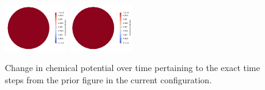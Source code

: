 \documentclass[12pt,3p]{article}
\numberwithin{equation}{section}
\begin{document}
\begin{figure}[!htb]
\includegraphics[width=0.24\textwidth]{../Results/Sphere/S_140_chi_3.0e-01_G_1e+00_l0_2.0e+00/Images/ChemicalPotential/ChemPot_109}
\includegraphics[width=0.24\textwidth]{../Results/Sphere/S_140_chi_3.0e-01_G_1e+00_l0_2.0e+00/Images/ChemicalPotential/ChemPot_139}
\caption{Change in chemical potential over time pertaining to the exact time steps from the prior figure in the current configuration.}
\label{FigSphereChemEvo}
\end{figure}
\end{document}
